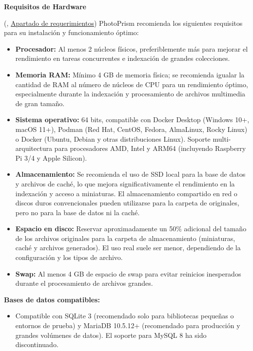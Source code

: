 \textbf{Requisitos de Hardware}

(\cite{photoprism-documentation}, \href{https://www.photoprism.app/plus/kb/requirements}{Apartado de requerimientos}) PhotoPrism recomienda los siguientes requisitos para su instalación y funcionamiento óptimo:

\begin{itemize}
    \item \textbf{Procesador:} Al menos 2 núcleos físicos, preferiblemente más para mejorar el rendimiento en tareas concurrentes e indexación de grandes colecciones.
    \item \textbf{Memoria RAM:} Mínimo 4 GB de memoria física; se recomienda igualar la cantidad de RAM al número de núcleos de CPU para un rendimiento óptimo, especialmente durante la indexación y procesamiento de archivos multimedia de gran tamaño.
    \item \textbf{Sistema operativo:} 64 bits, compatible con Docker Desktop (Windows 10+, macOS 11+), Podman (Red Hat, CentOS, Fedora, AlmaLinux, Rocky Linux) o Docker (Ubuntu, Debian y otras distribuciones Linux). Soporte multi-arquitectura para procesadores AMD, Intel y ARM64 (incluyendo Raspberry Pi 3/4 y Apple Silicon).
    \item \textbf{Almacenamiento:} Se recomienda el uso de SSD local para la base de datos y archivos de caché, lo que mejora significativamente el rendimiento en la indexación y acceso a miniaturas. El almacenamiento compartido en red o discos duros convencionales pueden utilizarse para la carpeta de originales, pero no para la base de datos ni la caché.
    \item \textbf{Espacio en disco:} Reservar aproximadamente un 50\% adicional del tamaño de los archivos originales para la carpeta de almacenamiento (miniaturas, caché y archivos generados). El uso real suele ser menor, dependiendo de la configuración y los tipos de archivo.
    \item \textbf{Swap:} Al menos 4 GB de espacio de swap para evitar reinicios inesperados durante el procesamiento de archivos grandes.
\end{itemize}

\textbf{Bases de datos compatibles:}
\begin{itemize}
    \item Compatible con SQLite 3 (recomendado solo para bibliotecas pequeñas o entornos de prueba) y MariaDB 10.5.12+ (recomendado para producción y grandes volúmenes de datos). El soporte para MySQL 8 ha sido discontinuado.
\end{itemize}

